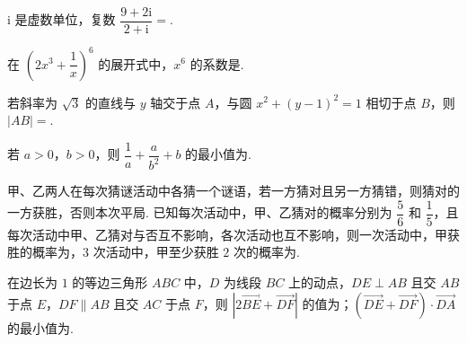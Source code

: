 \documentclass[a4paper,11pt]{report}
\begin{document}
\begin{examquestions}[start=10]

\item $\mathrm{i}$ 是虚数单位，复数 $\dfrac{9+2\mathrm{i}}{2+\mathrm{i}}=$\blank. 
\item 在 $\left(2x^3+\dfrac1x\right)^6$ 的展开式中，$x^6$ 的系数是\blank. 
\item 若斜率为 $\sqrt3$ 的直线与 $y$ 轴交于点 $A$，与圆 $x^2+(y-1)^2=1$ 相切于点 $B$，则 $|AB|=$\blank. 
\item 若 $a>0$，$b>0$，则 $\dfrac1a+\dfrac a{b^2}+b$ 的最小值为\blank. 
\item 甲、乙两人在每次猜谜活动中各猜一个谜语，若一方猜对且另一方猜错，则猜对的一方获胜，否则本次平局. 已知每次活动中，甲、乙猜对的概率分别为 $\dfrac56$ 和 $\dfrac15$，且每次活动中甲、乙猜对与否互不影响，各次活动也互不影响，则一次活动中，甲获胜的概率为\blank，$3$ 次活动中，甲至少获胜 $2$ 次的概率为\blank. 
\item 在边长为 $1$ 的等边三角形 $ABC$ 中，$D$ 为线段 $BC$ 上的动点，$DE\perp AB$ 且交 $AB$ 于点 $E$，$DF\parallel AB$ 且交 $AC$ 于点 $F$，则 $|2\overrightarrow{BE}+\overrightarrow{DF}|$ 的值为\blank；$(\overrightarrow{DE}+\overrightarrow{DF})\cdot\overrightarrow{DA}$ 的最小值为\blank. 

\end{examquestions}
\end{document}
